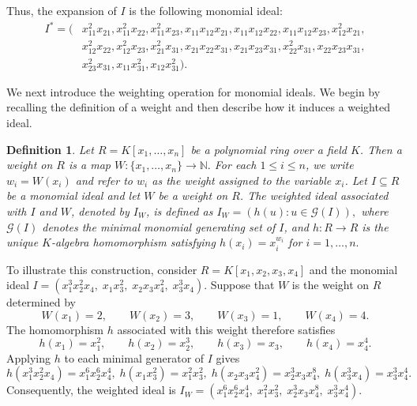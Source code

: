 \documentclass[11pt]{amsart}
\newtheorem{definition}[theorem]{Definition}
\begin{document}
Thus, the expansion of $I$ is the following monomial ideal:
\begin{align*}
I^*=(&
x_{11}^2x_{21},x_{11}^2x_{22},x_{11}^2x_{23},
x_{11}x_{12}x_{21},x_{11}x_{12}x_{22},x_{11}x_{12}x_{23},
x_{12}^2x_{21},\\
& x_{12}^2x_{22},x_{12}^2x_{23},x_{21}^2x_{31},x_{21}x_{22}x_{31},
x_{21}x_{23}x_{31},x_{22}^2x_{31},
x_{22}x_{23}x_{31}, \\ 
& x_{23}^2x_{31},  x_{11}x_{31}^2,x_{12}x_{31}^2).
\end{align*}




We next introduce the weighting operation for monomial ideals. We begin by recalling the definition of a weight and then describe how it induces a weighted ideal.

\begin{definition}
{\em 
Let $R=K[x_1,\ldots,x_n]$ be a polynomial ring over a field $K$. Then a \textit{weight} on $R$ is a map 
$W:\{x_1,\ldots,x_n\}\longrightarrow\mathbb{N}.$ For each $1\leq i \leq n$, we write $w_i=W(x_i)$ and refer to $w_i$ as the weight 
assigned to the variable $x_i$. Let $I\subseteq R$ be a monomial ideal and let $W$ be a weight on $R$. The \textit{weighted ideal} 
associated with $I$ and $W$, denoted by $I_W$, is defined as $I_W=(h(u):u\in\mathcal{G}(I)),$ where $\mathcal{G}(I)$ denotes 
the minimal monomial generating set of $I$, and $h:R\longrightarrow R$ is the unique $K$-algebra homomorphism 
satisfying $h(x_i)=x_i^{w_i}$  for $i=1,\ldots,n.$
}
\end{definition}

To illustrate this construction, consider $R=K[x_1,x_2,x_3,x_4]$ and the monomial ideal
 $I=(x_1^3x_2^2x_4,\;x_1x_3^2,\;x_2x_3x_4^2,\;x_3^3x_4).$ Suppose that $W$ is the weight on $R$ determined by
\[
W(x_1)=2,\qquad
W(x_2)=3,\qquad
W(x_3)=1,\qquad
W(x_4)=4.
\]
The homomorphism $h$ associated with this weight therefore satisfies
\[
h(x_1)=x_1^2,\qquad
h(x_2)=x_2^3,\qquad
h(x_3)=x_3,\qquad
h(x_4)=x_4^4.
\]
Applying $h$ to each minimal generator of $I$ gives
\[
h(x_1^3x_2^2x_4)=x_1^6x_2^6x_4^4,\; h(x_1x_3^2)=x_1^2x_3^2,\; h(x_2x_3x_4^2)=x_2^3x_3x_4^8, \; h(x_3^3x_4)
=x_3^3x_4^4.
\]
Consequently, the weighted ideal is  $I_W=(x_1^6x_2^6x_4^4,\;x_1^2x_3^2,\;x_2^3x_3x_4^8,\;x_3^3x_4^4).$ 
\end{document}
